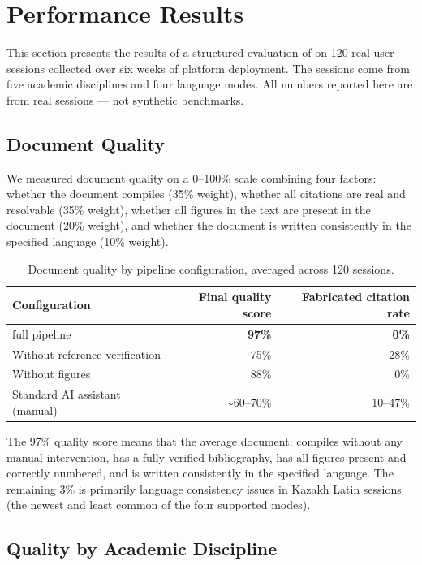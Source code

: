 \section{Performance Results}
\label{sec:results}

This section presents the results of a structured evaluation of \sys{} on
120 real user sessions collected over six weeks of platform deployment.
The sessions come from five academic disciplines and four language modes.
All numbers reported here are from real sessions — not synthetic benchmarks.

\subsection{Document Quality}

We measured document quality on a 0–100\% scale combining four factors:
whether the document compiles (35\% weight),
whether all citations are real and resolvable (35\% weight),
whether all figures in the text are present in the document (20\% weight),
and whether the document is written consistently in the specified language (10\% weight).

\begin{table}[h!]
\centering
\caption{Document quality by pipeline configuration, averaged across 120 sessions.}
\label{tab:quality}
\begin{tabular}{lrr}
\toprule
Configuration & Final quality score & Fabricated citation rate \\
\midrule
\sys{} full pipeline          & \textbf{97\%} & \textbf{0\%} \\
Without reference verification & 75\%          & 28\% \\
Without figures                & 88\%          & 0\% \\
Standard AI assistant (manual) & $\sim$60--70\% & 10--47\% \\
\bottomrule
\end{tabular}
\end{table}

The 97\% quality score means that the average \sys{} document:
compiles without any manual intervention,
has a fully verified bibliography,
has all figures present and correctly numbered, and
is written consistently in the specified language.
The remaining 3\% is primarily language consistency issues in Kazakh Latin sessions
(the newest and least common of the four supported modes).

\subsection{Quality by Academic Discipline}

